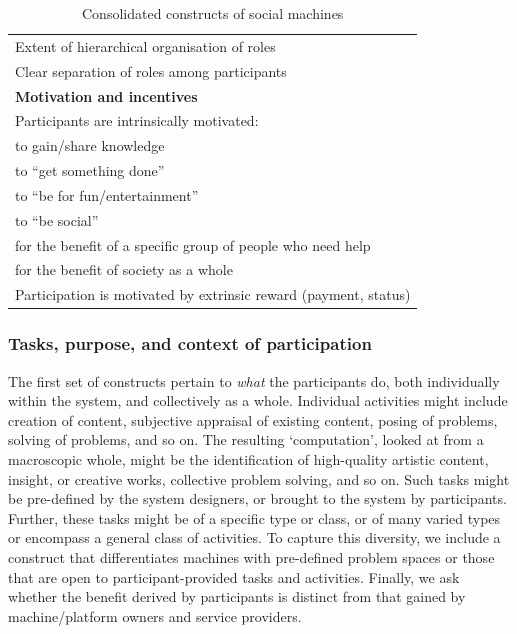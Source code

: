 \documentclass{sig-alternate}
\begin{document}
\begin{table}[htb]
\begin{center}
\begin{scriptsize}
\begin{tabular}{|p{8cm}|}
Extent of hierarchical organisation of roles \\
Clear separation of roles among participants \\
\hline
{\bf Motivation and incentives} \\
\hline
Participants are intrinsically motivated:\\
\hspace{1cm} to gain/share knowledge \\
\hspace{1cm} to ``get something done'' \\
\hspace{1cm} to ``be for fun/entertainment''\\
\hspace{1cm} to ``be social'' \\
\hspace{1cm} for the benefit of a specific group of people who need help \\
\hspace{1cm} for the benefit of society as a whole \\
Participation is motivated by extrinsic reward (payment, status) \\
\hline

\end{tabular}
\end{scriptsize}
\end{center}
\caption{Consolidated constructs of social machines} \label{table:constructs}
\end{table}

\subsubsection{Tasks, purpose, and context of participation}
The first set of constructs pertain to \emph{what} the participants
do, both individually within the system, and collectively as a whole.
Individual activities might include creation of content, subjective
appraisal of existing content, posing of problems, solving of
problems, and so on. The resulting `computation', looked at from a
macroscopic whole, might be the identification of high-quality
artistic content, insight, or creative works, collective problem
solving, and so on. Such tasks might be pre-defined by the system
designers, or brought to the system by participants. Further, these
tasks might be of a specific type or class, or of many varied types or
encompass a general class of activities. To capture this diversity,
we include a construct that differentiates machines with pre-defined problem spaces or those that are open to participant-provided tasks and activities. Finally, we ask whether the benefit derived by
participants is distinct from that gained by machine/platform owners
and service providers.
\end{document}
